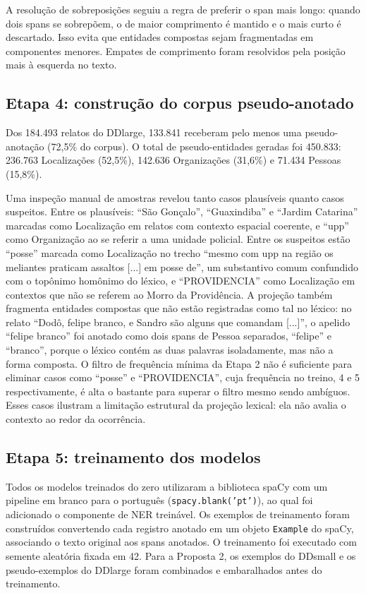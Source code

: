 \documentclass[12pt,a4paper]{article}
\begin{document}
A resolução de sobreposições seguiu a regra de preferir o span mais longo: quando
dois spans se sobrepõem, o de maior comprimento é mantido e o mais curto é
descartado. Isso evita que entidades compostas sejam fragmentadas em componentes
menores. Empates de comprimento foram resolvidos pela posição mais à esquerda
no texto.

\subsection{Etapa 4: construção do corpus pseudo-anotado}

Dos 184.493 relatos do DDlarge, 133.841 receberam pelo menos uma pseudo-anotação
(72,5\% do corpus). O total de pseudo-entidades geradas foi 450.833: 236.763
Localizações (52,5\%), 142.636 Organizações (31,6\%) e 71.434 Pessoas (15,8\%).

Uma inspeção manual de amostras revelou tanto casos plausíveis quanto casos
suspeitos. Entre os plausíveis: ``São Gonçalo'', ``Guaxindiba'' e ``Jardim
Catarina'' marcadas como Localização em relatos com contexto espacial
coerente, e ``upp'' como Organização ao se referir a uma unidade policial.
Entre os suspeitos estão ``posse'' marcada como Localização no trecho ``mesmo
com upp na região os meliantes praticam assaltos [...] em posse de'', um
substantivo comum confundido com o topônimo homônimo do léxico, e
``PROVIDENCIA'' como Localização em contextos que não se referem ao Morro da
Providência. A projeção também fragmenta entidades compostas que não estão
registradas como tal no léxico: no relato ``Dodô, felipe branco, e Sandro são
alguns que comandam [...]'', o apelido ``felipe branco'' foi anotado como
dois spans de Pessoa separados, ``felipe'' e ``branco'', porque o léxico
contém as duas palavras isoladamente, mas não a forma composta. O filtro de
frequência mínima da Etapa 2 não é suficiente para eliminar casos como
``posse'' e ``PROVIDENCIA'', cuja frequência no treino, 4 e 5 respectivamente,
é alta o bastante para superar o filtro mesmo sendo ambíguos. Esses casos
ilustram a limitação estrutural da projeção lexical: ela não avalia o
contexto ao redor da ocorrência.

\subsection{Etapa 5: treinamento dos modelos}

Todos os modelos treinados do zero utilizaram a biblioteca spaCy com um pipeline
em branco para o português (\texttt{spacy.blank('pt')}), ao qual foi adicionado
o componente de NER treinável. Os exemplos de treinamento foram construídos
convertendo cada registro anotado em um objeto \texttt{Example} do spaCy,
associando o texto original aos spans anotados. O treinamento foi executado com
semente aleatória fixada em 42. Para a Proposta 2, os exemplos do DDsmall e os
pseudo-exemplos do DDlarge foram combinados e embaralhados antes do treinamento.
\end{document}
